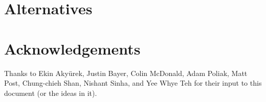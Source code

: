 \documentclass{article}
\begin{document}


\section{Alternatives}



\section*{Acknowledgements}

Thanks to Ekin Aky\"{u}rek, Justin Bayer, Colin McDonald, Adam Poliak, Matt Post, Chung-chieh Shan, Nishant Sinha, and Yee Whye Teh for their input to this document (or the ideas in it).

\iffalse %
\section*{References}
\fi



\end{document}
